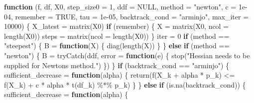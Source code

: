 \documentclass[
]{book}
\newenvironment{Shaded}{\begin{snugshade}}{\end{snugshade}}
\newcommand{\AttributeTok}[1]{\textcolor[rgb]{0.77,0.63,0.00}{#1}}
\newcommand{\ConstantTok}[1]{\textcolor[rgb]{0.00,0.00,0.00}{#1}}
\newcommand{\ControlFlowTok}[1]{\textcolor[rgb]{0.13,0.29,0.53}{\textbf{#1}}}
\newcommand{\DecValTok}[1]{\textcolor[rgb]{0.00,0.00,0.81}{#1}}
\newcommand{\FloatTok}[1]{\textcolor[rgb]{0.00,0.00,0.81}{#1}}
\newcommand{\FunctionTok}[1]{\textcolor[rgb]{0.00,0.00,0.00}{#1}}
\newcommand{\NormalTok}[1]{#1}
\newcommand{\OtherTok}[1]{\textcolor[rgb]{0.56,0.35,0.01}{#1}}
\newcommand{\SpecialCharTok}[1]{\textcolor[rgb]{0.00,0.00,0.00}{#1}}
\newcommand{\StringTok}[1]{\textcolor[rgb]{0.31,0.60,0.02}{#1}}
\begin{document}
\begin{Shaded}
\begin{Highlighting}[]
\ControlFlowTok{function}\NormalTok{ (f, df, X0, }\AttributeTok{step\_size0 =} \DecValTok{1}\NormalTok{, }\AttributeTok{ddf =} \ConstantTok{NULL}\NormalTok{, }\AttributeTok{method =} \StringTok{"newton"}\NormalTok{, }\AttributeTok{c =} \FloatTok{1e{-}04}\NormalTok{, }\AttributeTok{remember =} \ConstantTok{TRUE}\NormalTok{, }\AttributeTok{tau =} \FloatTok{1e{-}05}\NormalTok{, }\AttributeTok{backtrack\_cond =} \StringTok{"arminjo"}\NormalTok{, }\AttributeTok{max\_iter =} \DecValTok{10000}\NormalTok{) }
\NormalTok{\{}
\NormalTok{    X\_latest }\OtherTok{=} \FunctionTok{matrix}\NormalTok{(X0)}
    \ControlFlowTok{if}\NormalTok{ (remember) \{}
\NormalTok{        X }\OtherTok{=} \FunctionTok{matrix}\NormalTok{(X0, }\AttributeTok{ncol =} \FunctionTok{length}\NormalTok{(X0))}
\NormalTok{        steps }\OtherTok{=} \FunctionTok{matrix}\NormalTok{(}\AttributeTok{ncol =} \FunctionTok{length}\NormalTok{(X0))}
\NormalTok{    \}}
\NormalTok{    iter }\OtherTok{=} \DecValTok{0}
    \ControlFlowTok{if}\NormalTok{ (method }\SpecialCharTok{==} \StringTok{"steepest"}\NormalTok{) \{}
\NormalTok{        B }\OtherTok{=} \ControlFlowTok{function}\NormalTok{(X) \{}
            \FunctionTok{diag}\NormalTok{(}\FunctionTok{length}\NormalTok{(X))}
\NormalTok{        \}}
\NormalTok{    \}}
    \ControlFlowTok{else} \ControlFlowTok{if}\NormalTok{ (method }\SpecialCharTok{==} \StringTok{"newton"}\NormalTok{) \{}
\NormalTok{        B }\OtherTok{=} \FunctionTok{tryCatch}\NormalTok{(ddf, }\AttributeTok{error =} \ControlFlowTok{function}\NormalTok{(e) \{}
            \FunctionTok{stop}\NormalTok{(}\StringTok{"Hessian needs to be supplied for Newton\textquotesingle{}s method."}\NormalTok{)}
\NormalTok{        \})}
\NormalTok{    \}}
    \ControlFlowTok{if}\NormalTok{ (backtrack\_cond }\SpecialCharTok{==} \StringTok{"arminjo"}\NormalTok{) \{}
\NormalTok{        sufficient\_decrease }\OtherTok{=} \ControlFlowTok{function}\NormalTok{(alpha) \{}
            \FunctionTok{return}\NormalTok{(}\FunctionTok{f}\NormalTok{(X\_k }\SpecialCharTok{+}\NormalTok{ alpha }\SpecialCharTok{*}\NormalTok{ p\_k) }\SpecialCharTok{\textless{}=} \FunctionTok{f}\NormalTok{(X\_k) }\SpecialCharTok{+}\NormalTok{ c }\SpecialCharTok{*}\NormalTok{ alpha }\SpecialCharTok{*} \FunctionTok{t}\NormalTok{(df\_k) }\SpecialCharTok{\%*\%}\NormalTok{ p\_k)}
\NormalTok{        \}}
\NormalTok{    \}}
    \ControlFlowTok{else} \ControlFlowTok{if}\NormalTok{ (}\FunctionTok{is.na}\NormalTok{(backtrack\_cond)) \{}
\NormalTok{        sufficient\_decrease }\OtherTok{=} \ControlFlowTok{function}\NormalTok{(alpha) \{}

\end{Highlighting}
\end{Shaded}
\end{document}
